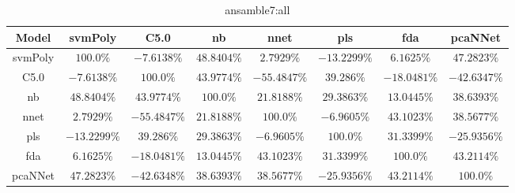 \begin{table}[!ht]
	\centering
	\begin{tabular}{|c|c|c|c|c|c|c|c|}
		\hline
		Model & svmPoly & C5.0 & nb & nnet & pls & fda & pcaNNet \\ \hline
		svmPoly & $100.0\%$ & $-7.6138\%$ & $48.8404\%$ & $2.7929\%$ & $-13.2299\%$ & $6.1625\%$ & $47.2823\%$ \\ \hline
		C5.0 & $-7.6138\%$ & $100.0\%$ & $43.9774\%$ & $-55.4847\%$ & $39.286\%$ & $-18.0481\%$ & $-42.6347\%$ \\ \hline
		nb & $48.8404\%$ & $43.9774\%$ & $100.0\%$ & $21.8188\%$ & $29.3863\%$ & $13.0445\%$ & $38.6393\%$ \\ \hline
		nnet & $2.7929\%$ & $-55.4847\%$ & $21.8188\%$ & $100.0\%$ & $-6.9605\%$ & $43.1023\%$ & $38.5677\%$ \\ \hline
		pls & $-13.2299\%$ & $39.286\%$ & $29.3863\%$ & $-6.9605\%$ & $100.0\%$ & $31.3399\%$ & $-25.9356\%$ \\ \hline
		fda & $6.1625\%$ & $-18.0481\%$ & $13.0445\%$ & $43.1023\%$ & $31.3399\%$ & $100.0\%$ & $43.2114\%$ \\ \hline
		pcaNNet & $47.2823\%$ & $-42.6348\%$ & $38.6393\%$ & $38.5677\%$ & $-25.9356\%$ & $43.2114\%$ & $100.0\%$ \\ \hline
	\end{tabular}
	\caption{ansamble7:all}
	\label{tab:ansamble7:all}
\end{table}
